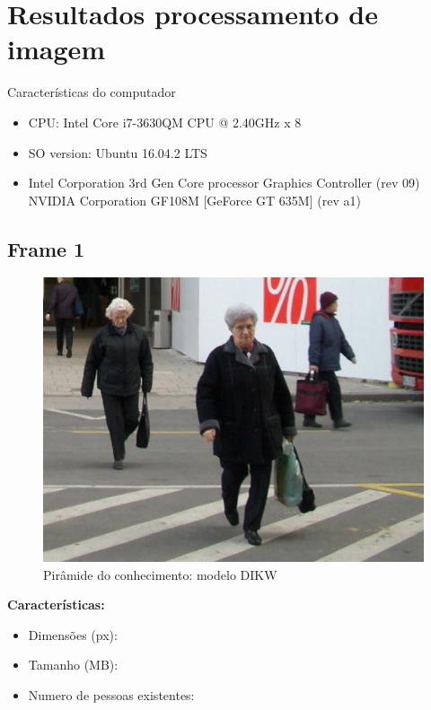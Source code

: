 \chapter{Resultados processamento de imagem }

Características do computador 
\begin{itemize}
	\item CPU: Intel Core i7-3630QM CPU @ 2.40GHz x 8
	\item SO version: Ubuntu 16.04.2 LTS
	\item Intel Corporation 3rd Gen Core processor Graphics Controller (rev 09)
	NVIDIA Corporation GF108M [GeForce GT 635M] (rev a1)
\end{itemize}



\newpage
\section{Frame 1}



\begin{figure}[!htb]
	\centering
	\includegraphics[width=0.5\linewidth]{img/vision/frame1.jpg}
	\caption{Pirâmide do conhecimento: modelo DIKW}
	\label{db}
\end{figure}


\textbf{Características: }
\begin{itemize}
	\item Dimensões (px): 
	\item Tamanho (MB): 
	\item Numero de pessoas existentes: 
\end{itemize}



